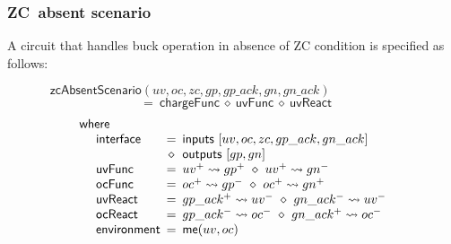 \documentclass[british, journal]{IEEEtran}
\begin{document}
\subsubsection{ZC~absent scenario}

A circuit that handles buck operation in absence of ZC condition is specified as follows:

\newpage
\[
\mathsf{zcAbsentScenario}(uv,oc,zc,gp,gp\_ack,gn,gn\_ack)~~~~~~~~~~~~~~~~~~~~~~~~~~~~~~~
\]
\vspace{-6mm}
\[
~~=~\mathsf{chargeFunc}~\diamond~\mathsf{uvFunc}~\diamond~\mathsf{uvReact}
\]
\vspace{-5mm}
\[
\begin{array}{lcl}
\mathsf{where}&~&\\

~~~~\mathsf{interface}&\hspace{-2mm}=&\hspace{-2mm}\mathsf{inputs}~[uv, oc, zc, gp\_ack, gn\_ack]\\
~&\hspace{-2mm}\diamond&\hspace{-2mm}\mathsf{outputs}~[gp, gn]\\

~~~~\mathsf{uvFunc}&\hspace{-2mm}=&\hspace{-2mm}uv^{+}\rightsquigarrow gp^{+}~\diamond~ uv^{+}\rightsquigarrow gn^{-}\\

~~~~\mathsf{ocFunc}&\hspace{-2mm}=&\hspace{-2mm}oc^{+}\rightsquigarrow gp^{-}~\diamond~ oc^{+}\rightsquigarrow gn^{+}\\

~~~~\mathsf{uvReact}&\hspace{-2mm}=&\hspace{-2mm}gp\_ack^{+}\rightsquigarrow uv^{-}~\diamond~gn\_ack^{-}\rightsquigarrow uv^{-}\\

~~~~\mathsf{ocReact}&\hspace{-2mm}=&\hspace{-2mm}gp\_ack^{-}\rightsquigarrow oc^{-}~\diamond~gn\_ack^{+}\rightsquigarrow oc^{-}\\

~~~~\mathsf{environment}&\hspace{-2mm}=&\hspace{-2mm}\mathsf{me}(uv, oc)\\


\end{array}\]
\end{document}
